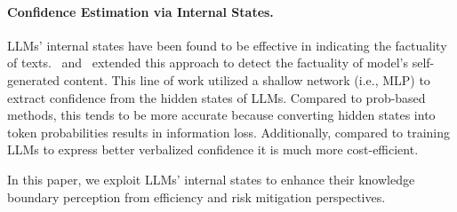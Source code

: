 \paragraph{Confidence Estimation via Internal States.}
LLMs' internal states have been found to be effective in indicating the factuality of texts.~\citep{azaria2023internal,slobodkin2023curious} and~\citep{su2024unsupervised,chen2024inside} extended this approach to detect the factuality of model’s self-generated content. This line of work utilized a shallow network (i.e., MLP) to extract confidence from the hidden states of LLMs. Compared to prob-based methods, this tends to be more accurate because converting hidden states into token probabilities results in information loss. Additionally, compared to training LLMs to express better verbalized confidence it is much more cost-efficient.

 In this paper, we exploit LLMs' internal states to enhance their knowledge boundary perception from efficiency and risk mitigation perspectives.
